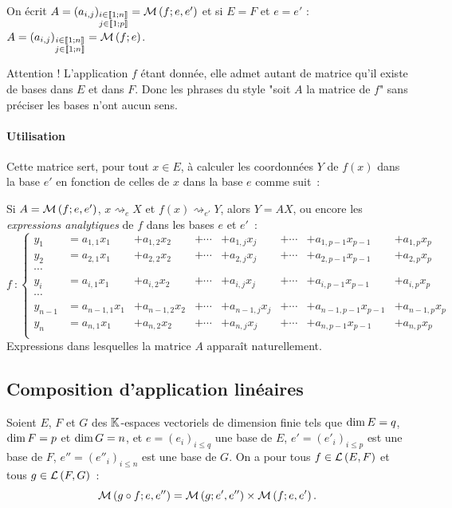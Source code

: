 On écrit $A = (a_{i,j})_{\substack{i \in \mathopen{\llbracket}1\mathclose{}\mathpunct{};n\mathclose{\rrbracket} \\ j \in \mathopen{\llbracket}1\mathclose{}\mathpunct{};p\mathclose{\rrbracket}}} = \mathcal{M}\left(f;e,e'\right)$ et si $E=F$ et $e=e'$ : $A = (a_{i,j})_{\substack{i \in \mathopen{\llbracket}1\mathclose{}\mathpunct{};n\mathclose{\rrbracket}\\ j \in \mathopen{\llbracket}1\mathclose{}\mathpunct{};n\mathclose{\rrbracket}}} = \mathcal{M}\left(f;e\right)$.

Attention ! L'application $f$ étant donnée, elle admet autant de matrice qu'il existe de bases dans $E$ et dans $F$. Donc les phrases du style "soit $A$ la matrice de $f$" sans préciser les bases n'ont aucun sens.

\paragraph{Utilisation}
Cette matrice sert, pour tout $x \in E$, à calculer les coordonnées $Y$ de $f(x)$ dans la base $e'$ en fonction de celles de $x$ dans la base $e$ comme suit~:

Si $A = \mathcal{M}\left(f;e,e'\right)$, $x \rightsquigarrow_{e} X$ et $f(x) \rightsquigarrow_{e'} Y$, alors $Y=AX$, ou encore les \emph{expressions analytiques} de $f$ dans les bases $e$ et $e'$~:
\begin{equation}
	f~:\left\{ \begin{array}{llllllll}
		y_1 &= a_{1,1} x_1 &+ a_{1,2} x_2 &+ \cdots &+ a_{1,j} x_{j} &+ \cdots &+ a_{1,p-1} x_{p-1} &+ a_{1,p} x_p \\
		y_2 &= a_{2,1} x_1 &+ a_{2,2} x_2 &+ \cdots &+ a_{2,j} x_{j} &+ \cdots &+ a_{2,p-1} x_{p-1} &+ a_{2,p} x_p \\
		\cdots \\
		y_i &= a_{i,1} x_1 &+ a_{i,2} x_2 &+ \cdots &+ a_{i,j} x_{j} &+ \cdots &+ a_{i,p-1} x_{p-1} &+ a_{i,p} x_p \\
		\cdots \\
		y_{n-1} &= a_{n-1,1} x_1 &+ a_{n-1,2} x_2 &+ \cdots &+ a_{n-1,j} x_{j} &+ \cdots &+ a_{n-1,p-1} x_{p-1} &+ a_{n-1,p} x_p \\
		y_n &= a_{n,1} x_1 &+ a_{n,2} x_2 &+ \cdots &+ a_{n,j} x_{j} &+ \cdots &+ a_{n,p-1} x_{p-1} &+ a_{n,p} x_p \\
	\end{array}
\right.
\end{equation}
Expressions dans lesquelles la matrice $A$ apparaît naturellement.

\subsection{Composition d'application linéaires}
Soient $E$, $F$ et $G$ des $\mathbb{K}$-espaces vectoriels de dimension finie tels que $\operatorname{dim}{E}=q$, $\operatorname{dim}{F}=p$ et $\operatorname{dim}{G}=n$, et $e=(e_i)_{i\leqslant q}$ une base de $E$, $e'=(e'_i)_{i\leqslant p}$ est une base de $F$,  $e''=(e''_i)_{i\leqslant n}$ est une base de $G$. On a pour tous $f \in \mathcal{L}\left(E,F\right)$ et tous $g\in\mathcal{L}\left(F,G\right)$~:
\begin{equation}
	\mathcal{M}\left(g\circ f;e,e''\right) = \mathcal{M}\left(g;e',e''\right) \times \mathcal{M}\left(f;e,e'\right).
\end{equation}

